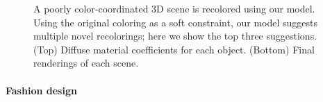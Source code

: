 \begin{figure}[t]
\caption{A poorly color-coordinated 3D scene is recolored using our model. Using the original coloring as a soft constraint, our model suggests multiple novel recolorings; here we show the top three suggestions. (Top) Diffuse material coefficients for each object. (Bottom) Final renderings of each scene.}
\label{fig:sceneRecoloring}
\vspace{-1.0em}
\end{figure}

\paragraph{Fashion design}


%
%
%
%
